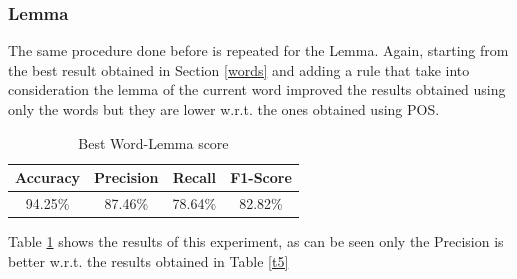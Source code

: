 \documentclass[11pt,a4paper]{article}
\begin{document}
\subsubsection{Lemma}
The same procedure done before is repeated for the Lemma. Again, starting from the best result obtained in Section \ref{words} and adding a rule that take into consideration the lemma of the current word improved the results obtained using only the words but they are lower w.r.t. the ones obtained using POS.
\begin{table}[H]
    \begin{center}
        \begin{tabular}{|c|c|c|c|}
            \hline \bf Accuracy &   \bf Precision &  \bf Recall &  \bf F1-Score   \\ \hline
            94.25\% & 87.46\% & 78.64\% & 82.82\%\\
            \hline
        \end{tabular}
    \end{center}
    \caption{\label{t6} Best Word-Lemma score}
\end{table}

Table \ref{t6} shows the results of this experiment, as can be seen only the Precision is better w.r.t. the results obtained in Table \ref{t5}
\end{document}
